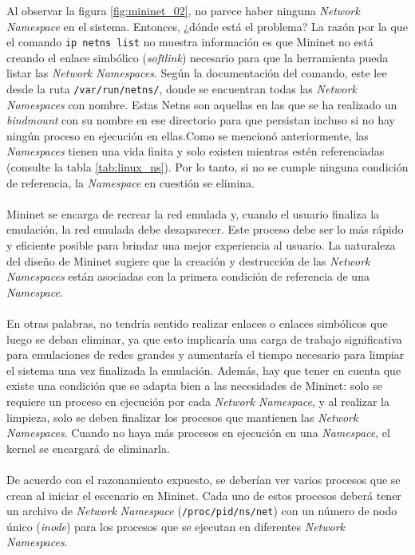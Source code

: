 Al observar la figura \ref{fig:mininet_02}, no parece haber ninguna \textit{Network Namespace} en el sistema. Entonces, ¿dónde está el problema? La razón por la que el comando \texttt{ip netns list} no muestra información es que Mininet no está creando el enlace simbólico (\textit{softlink}) necesario para que la herramienta pueda listar las \textit{Network Namespaces}. Según la documentación del comando, este lee desde la ruta \texttt{/var/run/netns/}, donde se encuentran todas las \textit{Network Namespaces} con nombre. Estas Netns son aquellas en las que se ha realizado un \textit{bindmount} con su nombre en ese directorio para que persistan incluso si no hay ningún proceso en ejecución en ellas.Como se mencionó anteriormente, las \textit{Namespaces} tienen una vida finita y solo existen mientras estén referenciadas (consulte la tabla \ref{tab:linux_ns}). Por lo tanto, si no se cumple ninguna condición de referencia, la \textit{Namespace} en cuestión se elimina.\\
\\
Mininet se encarga de recrear la red emulada y, cuando el usuario finaliza la emulación, la red emulada debe desaparecer. Este proceso debe ser lo más rápido y eficiente posible para brindar una mejor experiencia al usuario. La naturaleza del diseño de Mininet sugiere que la creación y destrucción de las \textit{Network Namespaces} están asociadas con la primera condición de referencia de una \textit{Namespace}.\\
\\
En otras palabras, no tendría sentido realizar enlaces o enlaces simbólicos que luego se deban eliminar, ya que esto implicaría una carga de trabajo significativa para emulaciones de redes grandes y aumentaría el tiempo necesario para limpiar el sistema una vez finalizada la emulación. Además, hay que tener en cuenta que existe una condición que se adapta bien a las necesidades de Mininet: solo se requiere un proceso en ejecución por cada \textit{Network Namespace}, y al realizar la limpieza, solo se deben finalizar los procesos que mantienen las \textit{Network Namespaces}. Cuando no haya más procesos en ejecución en una \textit{Namespace}, el kernel se encargará de eliminarla.\\
\\
De acuerdo con el razonamiento expuesto, se deberían ver varios procesos que se crean al iniciar el escenario en Mininet. Cada uno de estos procesos deberá tener un archivo de \textit{Network Namespace} (\texttt{/proc/{pid}/ns/net}) con un número de nodo único (\textit{inode}) para los procesos que se ejecutan en diferentes \textit{Network Namespaces}.\\

